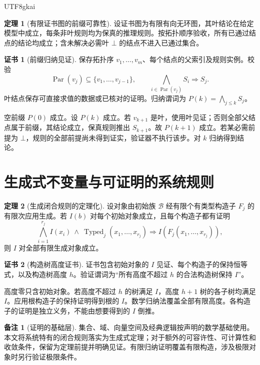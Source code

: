 \documentclass[12pt]{report}
\makeatletter
\theoremstyle{definition}
\newtheorem{theorem}{定理}[chapter]
\newtheorem{remark}{备注}[chapter]
\newtheorem{Certificate}{证书}[chapter]
\renewenvironment{proof}[1][\proofname]{\par
  \pushQED{\qed}\normalfont
  \topsep6\p@\@plus6\p@\relax
  \trivlist
  \item[\hskip\labelsep\normalfont #1\@addpunct{.}]\ignorespaces
}{
  \popQED\endtrivlist\@endpefalse
}
\makeatother
\begin{document}
\begin{CJK*}{UTF8}{gkai}
\begin{theorem}[有限证书图的前缀可靠性]
\label{thm:dag}
设证书图为有限有向无环图，其叶结论在给定模型中成立，每条非叶规则均为保真的推理规则。按拓扑顺序验收，所有已通过结点的结论均成立；含未解决必需叶 \(\bot\) 的结点不进入已通过集合。
\end{theorem}
\begin{Certificate}[前缀归纳见证]
保存拓扑序 \(v_1,\ldots,v_m\)、每个结点的父索引及规则实例。校验
\[
\operatorname{Par}(v_j)\subseteq\{v_1,\ldots,v_{j-1}\},\qquad
\bigwedge_{i\in\operatorname{Par}(v_j)}S_i\Rightarrow S_j.
\]
叶结点保存可直接求值的数据或已核对的证明。归纳谓词为 \(P(k)=\bigwedge_{j\le k}S_j\)。
\end{Certificate}
\begin{proof}
空前缀 \(P(0)\) 成立。设 \(P(k)\) 成立。若 \(v_{k+1}\) 是叶，使用叶见证；否则全部父结点属于前缀，其结论成立，保真规则推出 \(S_{k+1}\)。故 \(P(k+1)\) 成立。若某必需前提为 \(\bot\)，规则的全部前提尚未得到证实，验证器不执行该步。对 \(k\) 归纳得到结论。
\end{proof}

\section{生成式不变量与可证明的系统规则}
\begin{theorem}[生成闭合规则的定理化]
\label{thm:generated}
设对象由初始族 \(\mathcal B\) 经有限个有类型构造子 \(F_j\) 的有限次应用生成。若 \(I(b)\) 对每个初始对象成立，且每个构造子都有证明
\[
\bigwedge_{i=1}^{r_j}I(x_i)\ \wedge\ \operatorname{Typed}_j(x_1,\ldots,x_{r_j})
\Rightarrow I(F_j(x_1,\ldots,x_{r_j})),
\]
则 \(I\) 对全部有限生成对象成立。
\end{theorem}
\begin{Certificate}[构造树高度证书]
证书包含初始对象的 \(I\) 见证、每个构造子的保持恒等式，以及构造树高度 \(h\)。验证谓词为“所有高度不超过 \(h\) 的合法构造树保持 \(I\)”。
\end{Certificate}
\begin{proof}
高度零只含初始对象。若高度不超过 \(h\) 的树满足 \(I\)，高度 \(h+1\) 树的各子树均满足 \(I\)。应用根构造子的保持证明得到根的 \(I\)。数学归纳法覆盖全部有限高度。各构造子的证明是独立义务，不能由想要得到的 \(I\) 倒推。
\end{proof}
\begin{remark}[证明的基础层]
集合、域、向量空间及经典逻辑按声明的数学基础使用。本文将系统特有的闭合规则落实为生成式定理；对于额外的可容许性、可计算性和收敛条件，保留为定理前提并明确见证。有限归纳证明覆盖有限构造，涉及极限对象时另行验证极限条件。
\end{remark}


\end{CJK*}
\end{document}
